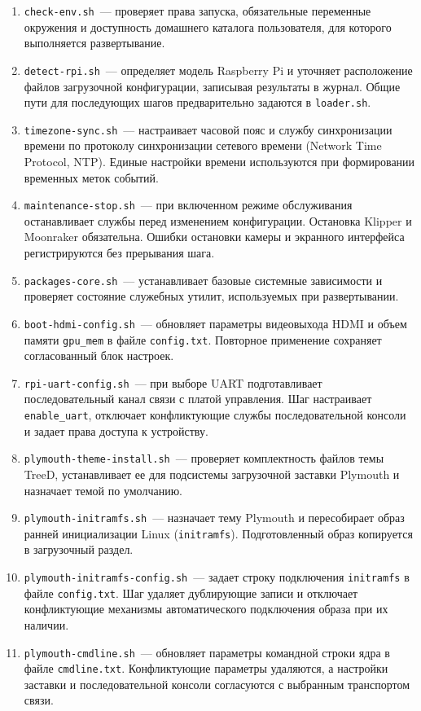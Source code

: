 \begin{enumerate}
\item \texttt{check-env.sh}~--- проверяет права запуска, обязательные переменные окружения и доступность домашнего каталога пользователя, для которого выполняется развертывание.
\item \texttt{detect-rpi.sh}~--- определяет модель Raspberry Pi и уточняет расположение файлов загрузочной конфигурации, записывая результаты в журнал. Общие пути для последующих шагов предварительно задаются в \texttt{loader.sh}.
\item \texttt{timezone-sync.sh}~--- настраивает часовой пояс и службу синхронизации времени по протоколу синхронизации сетевого времени (Network Time Protocol, NTP). Единые настройки времени используются при формировании временных меток событий.
\item \texttt{maintenance-stop.sh}~--- при включенном режиме обслуживания останавливает службы перед изменением конфигурации. Остановка Klipper и Moonraker обязательна. Ошибки остановки камеры и экранного интерфейса регистрируются без прерывания шага.
\item \texttt{packages-core.sh}~--- устанавливает базовые системные зависимости и проверяет состояние служебных утилит, используемых при развертывании.
\item \texttt{boot-hdmi-config.sh}~--- обновляет параметры видеовыхода HDMI и объем памяти \texttt{gpu\_mem} в файле \texttt{config.txt}. Повторное применение сохраняет согласованный блок настроек.
\item \texttt{rpi-uart-config.sh}~--- при выборе UART подготавливает последовательный канал связи с платой управления. Шаг настраивает \texttt{enable\_uart}, отключает конфликтующие службы последовательной консоли и задает права доступа к устройству.
\item \texttt{plymouth-theme-install.sh}~--- проверяет комплектность файлов темы TreeD, устанавливает ее для подсистемы загрузочной заставки Plymouth и назначает темой по умолчанию.
\item \texttt{plymouth-initramfs.sh}~--- назначает тему Plymouth и пересобирает образ ранней инициализации Linux (\texttt{initramfs}). Подготовленный образ копируется в загрузочный раздел.
\item \texttt{plymouth-initramfs-config.sh}~--- задает строку подключения \texttt{initramfs} в файле \texttt{config.txt}. Шаг удаляет дублирующие записи и отключает конфликтующие механизмы автоматического подключения образа при их наличии.
\item \texttt{plymouth-cmdline.sh}~--- обновляет параметры командной строки ядра в файле \texttt{cmdline.txt}. Конфликтующие параметры удаляются, а настройки заставки и последовательной консоли согласуются с выбранным транспортом связи.

\end{enumerate}
